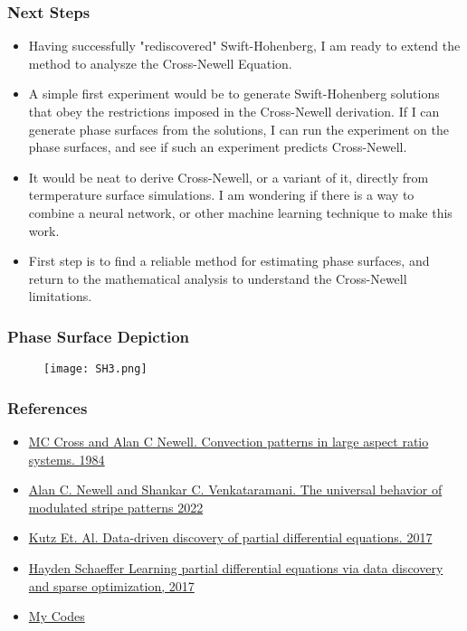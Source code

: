 \documentclass[]{beamer}
\begin{document}
\begin{frame}
     \frametitle{Next Steps}
     \begin{itemize}
         \item Having successfully "rediscovered" Swift-Hohenberg, I am ready to extend the method to analysze the Cross-Newell Equation.
        \item A simple first experiment would be to generate Swift-Hohenberg solutions that obey the restrictions imposed in the Cross-Newell derivation. If I can generate phase surfaces from the solutions, I can run the experiment on the phase surfaces, and see if such an experiment predicts Cross-Newell.
        \item It would be neat to derive Cross-Newell, or a variant of it, directly from termperature surface simulations. I am wondering if there is a way to combine a neural network, or other machine learning technique to make this work.
        \item First step is to find a reliable method for estimating phase surfaces, and return to the mathematical analysis to understand the Cross-Newell limitations.
     \end{itemize}
\end{frame}

\begin{frame}
     \frametitle{Phase Surface Depiction}
      \begin{figure}
        \centering
        \texttt{[image: SH3.png]}
        \end{figure}
\end{frame}







\begin{frame}
    \frametitle{References}
    \begin{itemize}
    \item \href{https://reader.elsevier.com/reader/sd/pii/0167278984901817?token=A7642367BF58BF047EA0B36FF9405D2765AECE238093AEE2121CD36F6E79244B94C8B9C1B05FEAC38C9E9A6C6C6C37DC&originRegion=us-east-1&originCreation=20221012224737}{MC Cross and Alan C Newell. Convection patterns in large aspect ratio systems. 1984}
    \item \href{https://www.cmu.edu/cee/convergence/preprints/UniversalBehaviorModulatedStripePatterns.pdf}{Alan C. Newell and Shankar C. Venkataramani. The universal behavior of modulated stripe patterns 2022}
    \item \href{https://www.science.org/doi/pdf/10.1126/sciadv.1602614}{Kutz Et. Al. Data-driven discovery of partial differential equations. 2017}
    \item \href{https://royalsocietypublishing.org/doi/pdf/10.1098/rspa.2016.0446}{Hayden Schaeffer Learning partial differential equations via data discovery and sparse optimization, 2017}
        \item \href{https://github.com/EMcDugald/convection_patterns}{My Codes}
    \end{itemize}
\end{frame}
\end{document}
